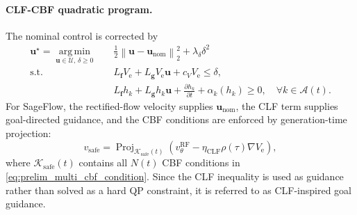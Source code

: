 \paragraph{CLF-CBF quadratic program.}
The nominal control is corrected by
\begin{align}
    \mathbf{u}^{\star}
    =
    \operatorname*{arg\,min}_{\mathbf{u}\in\mathcal{U},\,\delta\ge0}
    \quad&
    \frac{1}{2}
    \left\|\mathbf{u}-\mathbf{u}_{\mathrm{nom}}\right\|_2^2
    +
    \lambda_\delta\delta^2
    \label{eq:prelim_clf_cbf_qp}
    \\
    \text{s.t.}\quad&
    L_{\mathbf{f}}V_{\mathrm{e}}
    +
    L_{\mathbf{g}}V_{\mathrm{e}}\mathbf{u}
    +
    c_VV_{\mathrm{e}}
    \le\delta,
    \nonumber
    \\
    &
    L_{\mathbf{f}}h_k
    +
    L_{\mathbf{g}}h_k\mathbf{u}
    +
    \frac{\partial h_k}{\partial t}
    +
    \alpha_k(h_k)
    \ge0,
    \quad
    \forall k\in\mathcal{A}(t).
    \nonumber
\end{align}
For SageFlow, the rectified-flow velocity supplies
\(\mathbf{u}_{\mathrm{nom}}\), the CLF term supplies goal-directed
guidance, and the CBF conditions are enforced by generation-time
projection:
\begin{equation}
    v_{\mathrm{safe}}
    =
    \operatorname{Proj}_{\mathcal{K}_{\mathrm{safe}}(t)}
    \left(
    v_{\theta}^{\mathrm{RF}}
    -
    \eta_{\mathrm{CLF}}
    \rho(\tau)\nabla V_{\mathrm{e}}
    \right),
    \label{eq:prelim_sageflow_projection}
\end{equation}
where \(\mathcal{K}_{\mathrm{safe}}(t)\) contains all \(N(t)\) CBF
conditions in \eqref{eq:prelim_multi_cbf_condition}.  Since the CLF
inequality is used as guidance rather than solved as a hard QP
constraint, it is referred to as CLF-inspired goal guidance.
